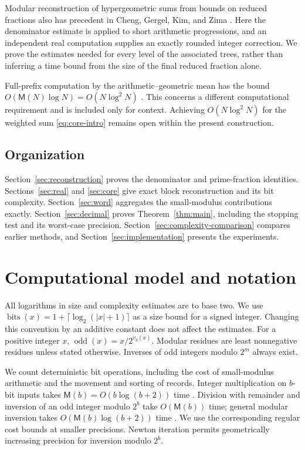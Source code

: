 \documentclass[11pt]{article}
\numberwithin{equation}{section}
\theoremstyle{definition}
\newcommand{\odd}{\operatorname{odd}}
\newcommand{\bits}{\operatorname{bits}}
\newcommand{\M}{\mathsf M}
\begin{document}
Modular reconstruction of hypergeometric sums from bounds on reduced
fractions also has precedent in Cheng, Gergel, Kim, and Zima
\cite{CGKZ05}. Here the denominator estimate is applied to short
arithmetic progressions, and an independent real computation supplies
an exactly rounded integer correction. We prove the estimates needed
for every level of the associated trees, rather than inferring a time
bound from the size of the final reduced fraction alone.

Full-prefix computation by the arithmetic--geometric mean has the
bound $O(\M(N)\log N)=O(N\log^2N)$
\cite{Brent76,Salamin76,BZ10}. This concerns a different
computational requirement and is included only for context.
Achieving $O(N\log^2N)$ for the weighted sum
\eqref{eq:core-intro} remains open within the present construction.

\subsection{Organization}

Section~\ref{sec:reconstruction} proves the denominator and
prime-fraction identities. Sections~\ref{sec:real} and \ref{sec:core}
give exact block reconstruction and its bit complexity.
Section~\ref{sec:word} aggregates the small-modulus contributions
exactly. Section~\ref{sec:decimal} proves
Theorem~\ref{thm:main}, including the stopping test and its worst-case
precision. Section~\ref{sec:complexity-comparison} compares earlier
methods, and Section~\ref{sec:implementation} presents the experiments.

\section{Computational model and notation}\label{sec:model}

All logarithms in size and complexity estimates are to base two.
We use $\bits(x)=1+\lceil\log_2(|x|+1)\rceil$ as a size bound for a
signed integer. Changing this convention by an additive constant
does not affect the estimates. For a positive integer $x$,
$\odd(x)=x/2^{v_2(x)}$. Modular residues are least nonnegative
residues unless stated otherwise. Inverses of odd integers modulo
$2^m$ always exist.

We count deterministic bit operations, including the cost of
small-modulus arithmetic and the movement and sorting of records.
Integer multiplication on $b$-bit inputs takes
$\M(b)=O(b\log(b+2))$ time \cite{HvdH21}. Division with remainder
and inversion of an odd integer modulo $2^b$ take $O(\M(b))$ time;
general modular inversion takes $O(\M(b)\log(b+2))$ time
\cite{BZ10}. We use the corresponding regular cost bounds at
smaller precisions. Newton iteration permits geometrically increasing
precision for inversion modulo $2^b$.
\end{document}
